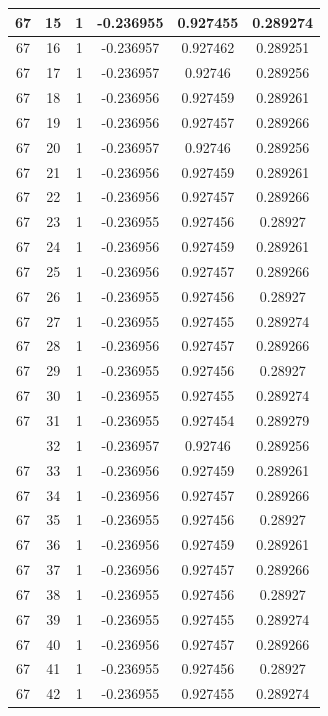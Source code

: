 \documentclass[12pt,a4paper]{article}
\numberwithin{equation}{section}
\numberwithin{figure}{section}
\numberwithin{table}{section}
\begin{document}
\begin{longtable}{|c|c|c|c|c|c|}
67 & 15 & 1 & -0.236955 & 0.927455 & 0.289274 \\ \hline
67 & 16 & 1 & -0.236957 & 0.927462 & 0.289251 \\ \hline
67 & 17 & 1 & -0.236957 & 0.92746 & 0.289256 \\ \hline
67 & 18 & 1 & -0.236956 & 0.927459 & 0.289261 \\ \hline
67 & 19 & 1 & -0.236956 & 0.927457 & 0.289266 \\ \hline
67 & 20 & 1 & -0.236957 & 0.92746 & 0.289256 \\ \hline
67 & 21 & 1 & -0.236956 & 0.927459 & 0.289261 \\ \hline
67 & 22 & 1 & -0.236956 & 0.927457 & 0.289266 \\ \hline
67 & 23 & 1 & -0.236955 & 0.927456 & 0.28927 \\ \hline
67 & 24 & 1 & -0.236956 & 0.927459 & 0.289261 \\ \hline
67 & 25 & 1 & -0.236956 & 0.927457 & 0.289266 \\ \hline
67 & 26 & 1 & -0.236955 & 0.927456 & 0.28927 \\ \hline
67 & 27 & 1 & -0.236955 & 0.927455 & 0.289274 \\ \hline
67 & 28 & 1 & -0.236956 & 0.927457 & 0.289266 \\ \hline
67 & 29 & 1 & -0.236955 & 0.927456 & 0.28927 \\ \hline
67 & 30 & 1 & -0.236955 & 0.927455 & 0.289274 \\ \hline
67 & 31 & 1 & -0.236955 & 0.927454 & 0.289279 \\ \hline
\pagebreak
67 & 32 & 1 & -0.236957 & 0.92746 & 0.289256 \\ \hline
67 & 33 & 1 & -0.236956 & 0.927459 & 0.289261 \\ \hline
67 & 34 & 1 & -0.236956 & 0.927457 & 0.289266 \\ \hline
67 & 35 & 1 & -0.236955 & 0.927456 & 0.28927 \\ \hline
67 & 36 & 1 & -0.236956 & 0.927459 & 0.289261 \\ \hline
67 & 37 & 1 & -0.236956 & 0.927457 & 0.289266 \\ \hline
67 & 38 & 1 & -0.236955 & 0.927456 & 0.28927 \\ \hline
67 & 39 & 1 & -0.236955 & 0.927455 & 0.289274 \\ \hline
67 & 40 & 1 & -0.236956 & 0.927457 & 0.289266 \\ \hline
67 & 41 & 1 & -0.236955 & 0.927456 & 0.28927 \\ \hline
67 & 42 & 1 & -0.236955 & 0.927455 & 0.289274 \\ \hline

\end{longtable}
\end{document}
